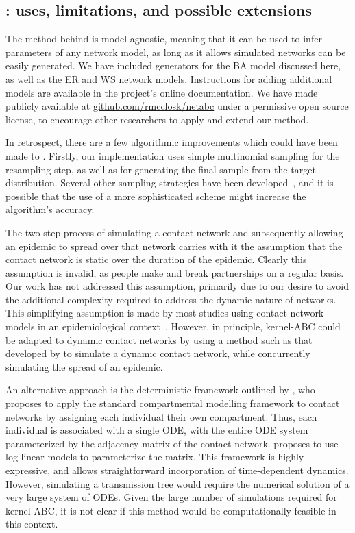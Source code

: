 \subsection{: uses, limitations, and possible extensions}

The method behind  is model-agnostic, meaning that it can be
used to infer parameters of any network model, as long as it allows simulated
networks can be easily generated. We have included generators for the \gls{BA}
model discussed here, as well as the \gls{ER} and \gls{WS} network models.
Instructions for adding additional models are available in the project's online
documentation. We have made  publicly available at
\url{github.com/rmcclosk/netabc} under a permissive open source license, to
encourage other researchers to apply and extend our method.

In retrospect, there are a few algorithmic improvements which could have been
made to . Firstly, our implementation uses simple multinomial
sampling for the resampling step, as well as for generating the final sample
from the target distribution.  Several other sampling strategies have been
developed~\autocite{douc2005comparison}, and it is possible that the use of a
more sophisticated scheme might increase the algorithm's accuracy. 


The two-step process of simulating a contact network and subsequently allowing
an epidemic to spread over that network carries with it the assumption that the
contact network is static over the duration of the epidemic. Clearly this
assumption is invalid, as people make and break partnerships on a regular
basis. Our work has not addressed this assumption, primarily due to our desire
to avoid the additional complexity required to address the dynamic nature of
networks. This simplifying assumption is made by most studies using contact
network models in an epidemiological context~\autocite{welch2011statistical,
bansal2007individual}. However, in principle, kernel-\gls{ABC} could be
adapted to dynamic contact networks by using a method such as that developed by
\textcite{robinson2012dynamics} to simulate a dynamic contact network, while
concurrently simulating the spread of an epidemic.

An alternative approach is the deterministic framework outlined by
\textcite{morris1993epidemiology}, who proposes to apply the standard
compartmental modelling framework to contact networks by assigning each
individual their own compartment. Thus, each individual is associated with a
single \gls{ODE}, with the entire \gls{ODE} system parameterized by the
adjacency matrix of the contact network. \citeauthor{morris1993epidemiology}
proposes to use log-linear models to parameterize the matrix. This framework is
highly expressive, and allows straightforward incorporation of time-dependent
dynamics. However, simulating a transmission tree would require the numerical
solution of a very large system of \glspl{ODE}. Given the large number of
simulations required for kernel-\gls{ABC}, it is not clear if this method would
be computationally feasible in this context.

